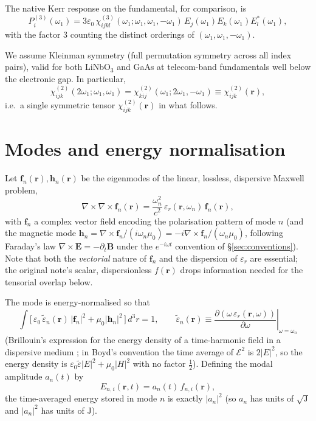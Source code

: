 \documentclass[11pt,a4paper]{article}
\newcommand{\eps}{\varepsilon}
\newcommand{\epstilde}{\widetilde{\varepsilon}}
\newcommand{\bvec}[1]{\mathbf{#1}}
\newcommand{\E}{\bvec{E}}
\newcommand{\f}{\bvec{f}}
\newcommand{\h}{\bvec{h}}
\newcommand{\ri}{\bvec{r}}
\newcommand{\dthreer}{\,d^{3}r}
\newcommand{\chitwo}{\chi^{(2)}}
\newcommand{\chithree}{\chi^{(3)}}
\begin{document}
The native Kerr response on the fundamental, for comparison, is
\begin{equation}
  P_i^{(3)}(\omega_1)=3\eps_0\,\chithree_{ijkl}(\omega_1;\omega_1,\omega_1,-\omega_1)\,
                     E_j(\omega_1)E_k(\omega_1)E_l^*(\omega_1),
\end{equation}
with the factor $3$ counting the distinct orderings of
$(\omega_1,\omega_1,-\omega_1)$.

We assume Kleinman symmetry (full permutation symmetry across all index
pairs), valid for both LiNbO$_3$ and GaAs at telecom-band fundamentals
well below the electronic gap.  In particular,
\begin{equation}
  \chitwo_{ijk}(2\omega_1;\omega_1,\omega_1)=\chitwo_{kij}(\omega_1;2\omega_1,-\omega_1)\equiv\chitwo_{ijk}(\ri),
\end{equation}
i.e.\ a single symmetric tensor $\chitwo_{ijk}(\ri)$ in what follows.

\section{Modes and energy normalisation}

Let $\f_n(\ri),\h_n(\ri)$ be the eigenmodes of the linear, lossless,
dispersive Maxwell problem,
\begin{equation}
  \nabla\!\times\!\nabla\!\times\!\f_n(\ri)
  =\frac{\omega_n^2}{c^2}\,\eps_r(\ri,\omega_n)\,\f_n(\ri),
\end{equation}
with $\f_n$ a complex vector field encoding the polarisation pattern of
mode $n$ (and the magnetic mode
$\h_n=\nabla\!\times\!\f_n/(i\omega_n\mu_0)=-i\nabla\!\times\!\f_n/(\omega_n\mu_0)$,
following Faraday's law $\nabla\!\times\!\E=-\partial_t\mathbf B$ under the
$e^{-i\omega t}$ convention of \S\ref{sec:conventions}).
Note that both the \emph{vectorial} nature of $\f_n$ and the dispersion
of $\eps_r$ are essential; the original note's scalar, dispersionless
$f(\ri)$ drops information needed for the tensorial overlap below.

The mode is energy-normalised so that
\begin{equation}
  \boxed{\;\int\!\!\bigl[\,\eps_0\,\epstilde_n(\ri)\,|\f_n|^2+\mu_0|\h_n|^2\,\bigr]\dthreer=1,
  \qquad
  \epstilde_n(\ri)\equiv\left.\frac{\partial(\omega\,\eps_r(\ri,\omega))}{\partial\omega}\right|_{\omega=\omega_n}\;}
\label{eq:Brillouin}
\end{equation}
(Brillouin's expression for the energy density of a time-harmonic field
in a dispersive medium \cite[\S 80]{LandauLifshitz}; in Boyd's
convention the time average of $\mathcal E^2$ is $2|E|^2$, so the
energy density is $\eps_0\epstilde|E|^2+\mu_0|H|^2$ with no factor
$\tfrac12$).  Defining the modal amplitude $a_n(t)$ by
\begin{equation}
  E_{n,i}(\ri,t)=a_n(t)\,f_{n,i}(\ri),
\end{equation}
the time-averaged energy stored in mode $n$ is exactly $|a_n|^2$
(so $a_n$ has units of $\sqrt{\mathrm J}$ and $|a_n|^2$ has units of $\mathrm J$).
\end{document}
